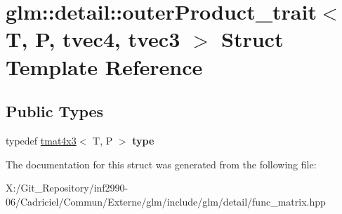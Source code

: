 \hypertarget{structglm_1_1detail_1_1outer_product__trait_3_01_t_00_01_p_00_01tvec4_00_01tvec3_01_4}{\section{glm\-:\-:detail\-:\-:outer\-Product\-\_\-trait$<$ T, P, tvec4, tvec3 $>$ Struct Template Reference}
\label{structglm_1_1detail_1_1outer_product__trait_3_01_t_00_01_p_00_01tvec4_00_01tvec3_01_4}
}
\subsection*{Public Types}
\begin{DoxyCompactItemize}
\item 
\hypertarget{structglm_1_1detail_1_1outer_product__trait_3_01_t_00_01_p_00_01tvec4_00_01tvec3_01_4_ac754af38f5684e757b9fcc70ecaea5c8}{typedef \hyperlink{structglm_1_1detail_1_1tmat4x3}{tmat4x3}$<$ T, P $>$ {\bfseries type}}\label{structglm_1_1detail_1_1outer_product__trait_3_01_t_00_01_p_00_01tvec4_00_01tvec3_01_4_ac754af38f5684e757b9fcc70ecaea5c8}

\end{DoxyCompactItemize}


The documentation for this struct was generated from the following file\-:\begin{DoxyCompactItemize}
\item 
X\-:/\-Git\-\_\-\-Repository/inf2990-\/06/\-Cadriciel/\-Commun/\-Externe/glm/include/glm/detail/func\-\_\-matrix.\-hpp\end{DoxyCompactItemize}
